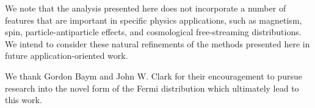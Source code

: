 \documentclass[sn-mathphys,Numbered]{sn-jnl}
\begin{document}
We note that the analysis presented here does not incorporate a number of features that are important in specific physics applications, such as magnetism, spin, particle-antiparticle effects, and cosmological free-streaming distributions. We intend to consider these natural refinements of the methods presented here in future application-oriented work.
 






\backmatter

We thank Gordon Baym and John W. Clark for their encouragement to pursue research into the novel form of the Fermi distribution which ultimately lead to this work.


\end{document}
